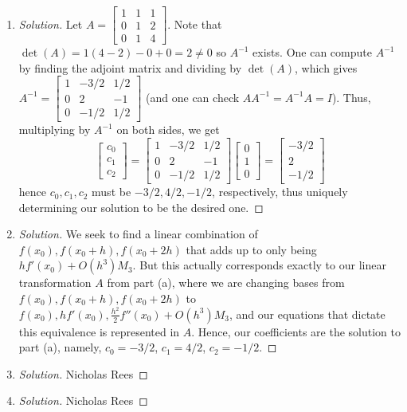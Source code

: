 \documentclass{article}
\begin{document}
\begin{enumerate}
	\item \begin{proof}[Solution]\let\qed\relax
		Let $A = \begin{bmatrix}
				1 & 1 & 1\\
				0 & 1 & 2\\
				0 & 1 & 4
			\end{bmatrix}$.
		Note that $\det(A) = 1(4-2) - 0 + 0 = 2 \neq 0$ so $A^{-1}$ exists.
		One can compute $A^{-1}$ by finding the adjoint matrix and dividing by $\det(A)$,
		which gives $A^{-1} = \begin{bmatrix}
				1 & -3/2 & 1/2\\
				0 & 2 & -1\\
				0 & -1/2 & 1/2
			\end{bmatrix}$
		(and one can check $AA^{-1} = A^{-1}A = I$).
		Thus, multiplying by $A^{-1}$ on both sides, we get
		\[
			\begin{bmatrix} c_0 \\ c_1 \\ c_2 \end{bmatrix}
			= \begin{bmatrix}
				1 & -3/2 & 1/2\\
				0 & 2 & -1\\
				0 & -1/2 & 1/2
			\end{bmatrix}
			\begin{bmatrix} 0 \\ 1 \\ 0 \end{bmatrix}
			= \begin{bmatrix} -3/2 \\ 2 \\ -1/2 \end{bmatrix}
		\]
		hence $c_0,c_1,c_2$ must be $-3/2,4/2,-1/2$, respectively,
		thus uniquely determining our solution to be the desired one.
	\end{proof}
	\item \begin{proof}[Solution]\let\qed\relax
		We seek to find a linear combination of $f(x_0),f(x_0 + h), f(x_0 + 2h)$
		that adds up to only being $hf'(x_0) + O(h^3)M_3$.
		But this actually corresponds exactly to our linear transformation
		$A$ from part (a),
		where we are changing bases from $f(x_0),f(x_0+h),f(x_0+2h)$
		to $f(x_0),hf'(x_0),\frac{h^2}{2}f''(x_0) + O(h^3)M_3$,
		and our equations that dictate this equivalence is represented in $A$.
		Hence, our coefficients are the solution to part (a),
		namely, $c_0 = -3/2$, $c_1 = 4/2$, $c_2 = -1/2$.
	\end{proof}
	\item \begin{proof}[Solution]\let\qed\relax
		Nicholas Rees
	\end{proof}
	\item \begin{proof}[Solution]\let\qed\relax
		Nicholas Rees
	\end{proof}
\end{enumerate}
\end{document}
